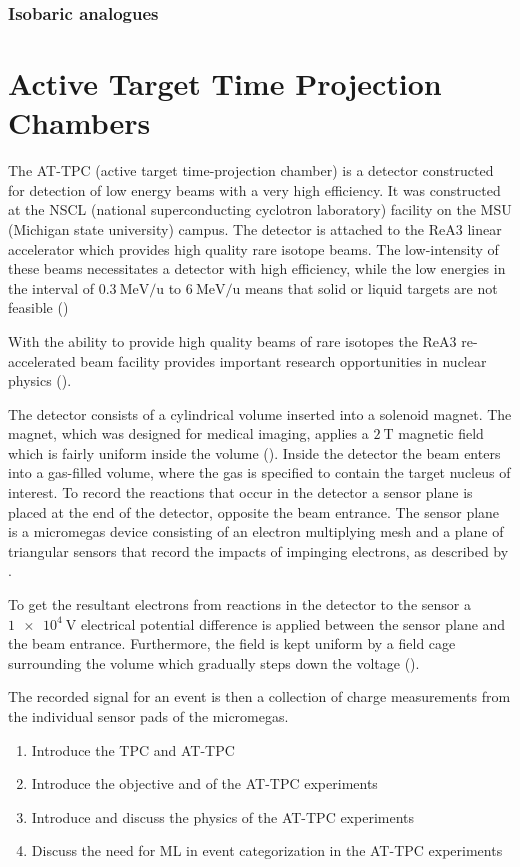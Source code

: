 \subsubsection{Isobaric analogues}

\section{Active Target Time Projection Chambers}\label{sec:attpc}

The AT-TPC (active target time-projection chamber) is a detector constructed for detection of low energy beams with a very high efficiency. It was constructed at the NSCL (national superconducting cyclotron laboratory) facility on the MSU (Michigan state university) campus. The detector is attached to the ReA3 linear accelerator which provides high quality rare isotope beams. The low-intensity of these beams necessitates a detector with high efficiency, while the low energies in the interval of $\SI[per-mode=symbol]{0.3}{\MeV \per \atomicmassunit}$ to $\SI[per-mode=symbol]{6}{\MeV \per \atomicmassunit}$ means that solid or liquid targets are not feasible (\cite{Bradt2017a})

 With the ability to provide high quality beams of rare isotopes the ReA3 re-accelerated beam facility  provides important research opportunities in nuclear physics (\cite{Kester2010}). 

 The detector consists of a cylindrical volume inserted into a solenoid magnet. The magnet, which was designed for medical imaging, applies a $\SI{2}{\tesla}$ magnetic field which is fairly uniform inside the volume (\cite{Bradt2017a}). Inside the detector the beam enters into a gas-filled volume, where the gas is specified to contain the target nucleus of interest. To record the reactions that occur in the detector a sensor plane is placed at the end of the detector, opposite the beam entrance. The sensor plane is a micromegas device consisting of an electron multiplying mesh and a plane of triangular sensors that record the impacts of impinging electrons, as described by \citet{Giomataris1996}. 

 To get the resultant electrons from reactions in the detector to the sensor a $\SI{1e4}{\volt}$ electrical potential difference is applied between the sensor plane and the beam entrance. Furthermore, the field is kept uniform by a field cage surrounding the volume which gradually steps down the voltage (\cite{Bradt2017a}).

The recorded signal for an event is then a collection of charge measurements from the individual sensor pads of the micromegas. 



\begin{enumerate}
	\item Introduce the TPC and AT-TPC
	\item Introduce the objective and of the AT-TPC experiments
	\item Introduce and discuss the physics of the AT-TPC experiments 
	\item Discuss the need for ML in event categorization in the AT-TPC experiments 
\end{enumerate}